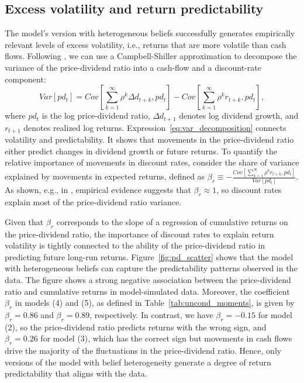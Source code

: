 \subsection{Excess volatility and return predictability}\label{sec:excess_volatility.sec}

The model's version with heterogeneous beliefs successfully generates empirically relevant levels of excess volatility, i.e., returns that are more volatile than cash flows.
Following \citet{cochrane1992explaining}, we can use a Campbell-Shiller approximation to decompose the variance of the price-dividend ratio into a cash-flow and a discount-rate component:
\begin{equation}\label{eq:var_decomposition}
    Var[pd_t] = Cov\left[ \sum_{k=1}^\infty \rho^k \Delta d_{t+k}, pd_t \right] - Cov\left[ \sum_{k=1}^\infty \rho^k r_{t+k}, pd_t \right],
\end{equation}
where $pd_t$ is the log price-dividend ratio, $\Delta d_{t+1}$ denotes log dividend growth, and $r_{t+1}$ denotes realized log returns.
Expression~\eqref{eq:var_decomposition} connects volatility and predictability. 
It shows that movements in the price-dividend ratio either predict changes in dividend growth or future returns. 
To quantify the relative importance of movements in discount rates, consider the share of variance explained by movements in expected returns, defined as $\beta_{r} \equiv -\frac{Cov\left[ \sum_{k=1}^\infty \rho^k r_{t+k}, pd_t \right]}{Var[pd_t]}$.
As shown, e.g., in \citet{cochrane2011presidential}, empirical evidence suggests that $\beta_{r} \approx 1$, so
discount rates explain most of the price-dividend ratio variance. 



    Given that $\beta_r$ corresponds to the slope of a regression of cumulative returns on the price-dividend ratio, the importance of discount rates to explain return volatility is tightly connected to the ability of the price-dividend ratio in predicting future long-run returns. 
    Figure~\ref{fig:pd_scatter} shows that the model with heterogeneous beliefs can capture the predictability patterns observed in the data. 
    The figure shows a strong negative association between the price-dividend ratio and cumulative returns in model-simulated data. 
    Moreover, the coefficient $\beta_r$ in models (4) and (5), as defined in Table~\ref{tab:uncond_moments}, is given by $\beta_r = 0.86$ and $\beta_r = 0.89$, respectively.
    In contrast, we have $\beta_r = -0.15$ for model (2), so the price-dividend ratio predicts returns with the wrong sign, and $\beta_r = 0.26$ for model (3), which has the correct sign but movements in cash flows drive the majority of the fluctuations in the price-dividend ratio. 
    Hence, only versions of the model with belief heterogeneity generate a degree of return predictability that aligns with the data.

